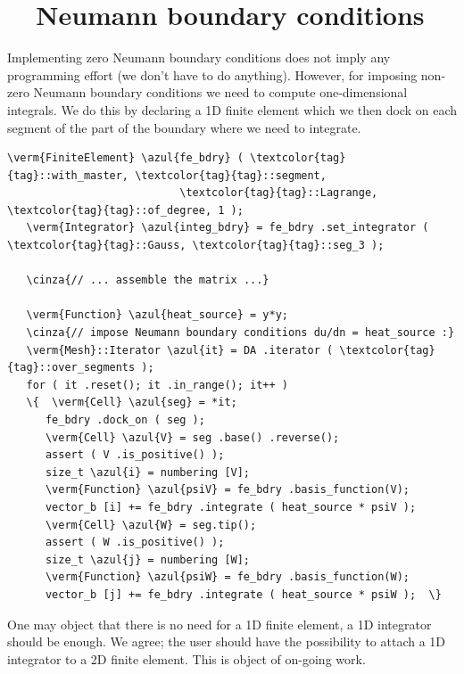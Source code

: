 \section{~~Neumann boundary conditions}\label{\numb section 6.\numb parag 3}

Implementing zero Neumann boundary conditions does not imply any programming effort
(we don't have to do anything).
However, for imposing non-zero Neumann boundary conditions we need to compute one-dimensional
integrals.
We do this by declaring a 1D finite element which we then dock on each segment of the
part of the boundary where we need to integrate.

\begin{Verbatim}[commandchars=\\\{\},formatcom=\small\tt,frame=single,
   label=parag-\ref{\numb section 6.\numb parag 3}.cpp,rulecolor=\color{coment},
   baselinestretch=0.94,framesep=2mm                                            ]
   \verm{FiniteElement} \azul{fe_bdry} ( \textcolor{tag}{tag}::with_master, \textcolor{tag}{tag}::segment,
                           \textcolor{tag}{tag}::Lagrange, \textcolor{tag}{tag}::of_degree, 1 );
   \verm{Integrator} \azul{integ_bdry} = fe_bdry .set_integrator ( \textcolor{tag}{tag}::Gauss, \textcolor{tag}{tag}::seg_3 );

   \cinza{// ... assemble the matrix ...}

   \verm{Function} \azul{heat_source} = y*y;
   \cinza{// impose Neumann boundary conditions du/dn = heat_source :}
   \verm{Mesh}::Iterator \azul{it} = DA .iterator ( \textcolor{tag}{tag}::over_segments );
   for ( it .reset(); it .in_range(); it++ )
   \{  \verm{Cell} \azul{seg} = *it;
      fe_bdry .dock_on ( seg );
      \verm{Cell} \azul{V} = seg .base() .reverse();
      assert ( V .is_positive() );
      size_t \azul{i} = numbering [V];
      \verm{Function} \azul{psiV} = fe_bdry .basis_function(V);
      vector_b [i] += fe_bdry .integrate ( heat_source * psiV );
      \verm{Cell} \azul{W} = seg.tip();
      assert ( W .is_positive() );
      size_t \azul{j} = numbering [W];
      \verm{Function} \azul{psiW} = fe_bdry .basis_function(W);
      vector_b [j] += fe_bdry .integrate ( heat_source * psiW );  \}
\end{Verbatim}

One may object that there is no need for a 1D finite element, a 1D integrator should be enough.
We agree; the user should have the possibility to attach a 1D integrator to a 2D finite element.
This is object of on-going work.

